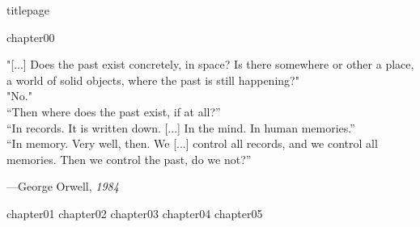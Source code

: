 \documentclass[a4paper,12pt,twoside]{book}
\begin{document}
    \frontmatter
    {titlepage}
    \restoregeometry    

    \cleardoublepage
    
    \setcounter{tocdepth}{1}
    \tableofcontents
    \restoregeometry
    \cleardoublepage
    
    
    \begingroup
    \let\clearpage\relax
    \let\cleardoublepage\relax
    \listoffigures    
    \listoftables
    \endgroup
    
    {chapter00}
    \cleardoublepage

    \thispagestyle{empty}
    \vspace*{\fill}
    \setlength{}
    \epigraph{
            "[...] Does the past exist concretely, in space? Is there somewhere or other a place, a world of solid objects, where the past is still happening?"\\
            "No."\\
            “Then where does the past exist, if at all?”\\
            “In records. It is written down. [...] In the mind. In human memories.”\\
            “In memory. Very well, then. We [...] control all records, and we control all memories. Then we control the past, do we not?”
    }{---George Orwell, \textit{1984}}
    \vspace*{\fill}
    \clearpage
    \thispagestyle{empty}
    \clearpage
    
    \mainmatter
    {chapter01}
    \cleardoublepage
    {chapter02}
    \cleardoublepage
    {chapter03}
    \cleardoublepage
    {chapter04}
    \cleardoublepage
    {chapter05}
    \cleardoublepage
    
    
    \backmatter
    \printglossary[type=\acronymtype, title=Acronimi e nomenclature, toctitle=Acronimi]
    \cleardoublepage
	\printbibliography[heading=bibintoc, title={Bibliografia}]
    \restoregeometry
\end{document}

